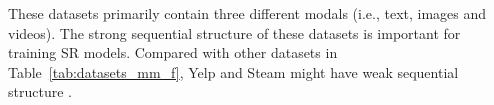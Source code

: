 \documentclass[review]{fcs}
\begin{document}
 
% 

	These datasets primarily contain three different modals (i.e., text, images and videos). The strong sequential structure of these datasets is important for training SR models. Compared with other datasets in Table~\ref{tab:datasets_mm_f}, Yelp and Steam might have weak sequential structure \cite{sequential_structure}.
\end{document}
